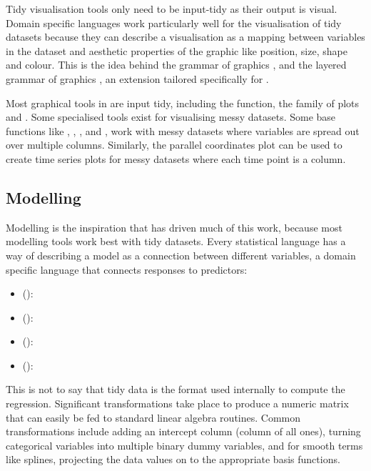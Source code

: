 \documentclass[article]{jss}
\begin{document}
Tidy visualisation tools only need to be input-tidy as their output is visual. Domain specific languages work particularly well for the visualisation of tidy datasets because they can describe a visualisation as a mapping between variables in the dataset and aesthetic properties of the graphic like position, size, shape and colour. This is the idea behind the grammar of graphics \citep{wilkinson:2006}, and the layered grammar of graphics \citep{wickham:2007d}, an extension tailored specifically for .

Most graphical tools in  are input tidy, including the   function, the  family of plots \citep{sarkar:2008} and  \citep{me:ggplot2}. Some specialised tools exist for visualising messy datasets. Some base  functions like , , , and , work with messy datasets where variables are spread out over multiple columns. Similarly, the parallel coordinates plot \citep{wegman:1990,inselberg:1985} can be used to create time series plots for messy datasets where each time point is a column.

\subsection{Modelling}
\label{sub:modelling}

Modelling is the inspiration that has driven much of this work, because most modelling tools work best with tidy datasets. Every statistical language has a way of describing a model as a connection between different variables, a domain specific language that connects responses to predictors: 

\begin{itemize}

  \item {} (): 

  \item {} (): 

  \item {} (): 

  \item {} (): 


\end{itemize}

This is not to say that tidy data is the format used internally to compute the regression. Significant transformations take place to produce a numeric matrix that can easily be fed to standard linear algebra routines. Common transformations include adding an intercept column (column of all ones), turning categorical variables into multiple binary dummy variables, and for smooth terms like splines, projecting the data values on to the appropriate basis functions.
\end{document}
